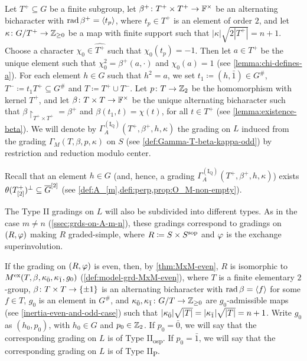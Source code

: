 \begin{defi}\label{def:Type-I_Q}
    Let $T^+ \subseteq G$ be a finite subgroup, let $\beta^+\colon T^+ \times T^+ \to \mathbb{F}^\times$ be an alternating bicharacter with $\operatorname{rad} \beta^+ = \langle t_p \rangle$, where $t_p\in T^+$ is an element of order $2$, and let $\kappa \colon G/T^+ \to \mathbb{Z}_{\geq 0}$ be a map with finite support such that $|\kappa| \sqrt{2|T^+|} = n+1$. 
    Choose a character $\chi_0 \in \widehat{T^+}$ such that $\chi_0 (t_p) = -1$. 
    Then let $a \in T^+$ be the unique element such that $\chi_0^2 = \beta^+(a, \cdot)$ and $\chi_0(a) = 1$ (see \cref{lemma:chi-defines-a}). 
    For each element $h \in G$ such that $h^2 = a$, we set $t_1 \coloneqq (h, \bar 1) \in G^\#$, $T^- \coloneqq t_1 T^+ \subseteq G^\#$ and $T \coloneqq T^+ \cup T^-$. 
    Let $p\colon T \to \mathbb{Z}_2$ be the homomorphism with kernel $T^+$, and let $\beta\colon T \times T \to \mathbb{F}^\times$ be the unique alternating bicharacter such that $\beta\restriction_{T^+ \times T^+} = \beta^+$ and $\beta(t_1, t) = \chi(t)$, for all $t\in T^+$ (see \cref{lemma:existence-beta}). 
    We will denote by  $\Gamma^{\mathrm{(I_Q)}}_A(T^+, \beta^+, h, \kappa)$ the grading on $L$ induced from the grading $\Gamma_M(T, \beta, p, \kappa)$ on $S$ (see \cref{def:Gamma-T-beta-kappa-odd}) by restriction and reduction modulo center. 
\end{defi}

Recall that an element $h \in G$ (and, hence, a grading $\Gamma^{\mathrm{(I_Q)}}_A(T^+, \beta^+, h, \kappa)$) exists \IFF $\theta(T^+_{[2]})^\perp \subseteq \barr G^{[2]}$ (see \cref{def:A_[m],defi:perp,prop:O_M-non-empty}).

The Type II gradings on $L$ will also be subdivided into different types. 
As in the case $m\neq n$ (\cref{ssec:grds-on-A-m-n}), these gradings correspond to gradings on $(R, \varphi)$ making $R$ graded-simple, where $R \coloneqq S \times S^{\mathrm{sop}}$ and $\varphi$ is the exchange superinvolution. 

If the grading on $(R,\varphi)$ is even, then, by \cref{thm:MxM-even}, $R$ is isomorphic to $M^{\mathrm{ex}} (T, \beta, \kappa_{\bar{0}}, \kappa_{\bar{1}}, g_0)$ (\cref{def:model-grd-MxM-even}), where $T$ is a finite elementary $2$-group, $\beta\colon T\times T \to \{ \pm 1 \}$ is an alternating bicharacter with $\operatorname{rad} \beta = \langle f \rangle$ for some $f \in T$, $g_0$ is an element in $G^\#$, and $\kappa_{\bar{0}}, \kappa_{\bar{1}} \colon G/T \to \mathbb{Z}_{\geq 0}$ are $g_0$-admissible maps (see \cref{inertia-even-and-odd-case}) such that $|\kappa_{\bar{0}}| \sqrt{|T|} = |\kappa_{\bar{1}}| \sqrt{|T|} = n+1$. 
Write $g_0$ as $(h_0, p_0)$, with $h_0 \in G$ and $p_0 \in \mathbb{Z}_2$. 
If $p_0 = \bar 0$, we will say that the corresponding grading on $L$ is of Type II\textsubscript{osp}. 
If $p_0 = \bar 1$, we will say that the corresponding grading on $L$ is of Type II\textsubscript{P}. 

